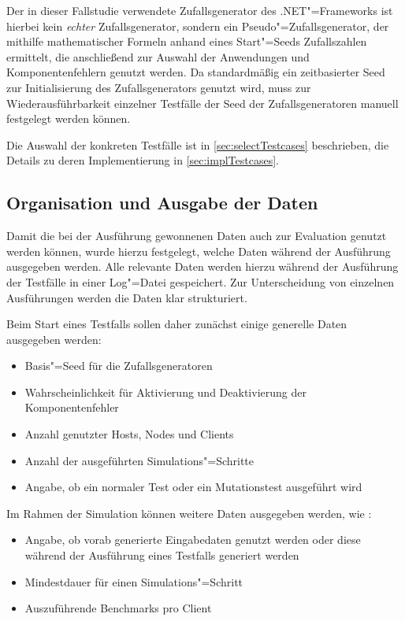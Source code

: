 Der in dieser Fallstudie verwendete Zufallsgenerator des .NET"=Frameworks ist hierbei kein \emph{echter} Zufallsgenerator, sondern ein Pseudo"=Zufallsgenerator, der mithilfe mathematischer Formeln anhand eines Start"=Seeds Zufallszahlen ermittelt, die anschließend zur Auswahl der Anwendungen und Komponentenfehlern genutzt werden.
Da standardmäßig ein zeitbasierter Seed zur Initialisierung des Zufallsgenerators genutzt wird, muss zur Wiederausführbarkeit einzelner Testfälle der Seed der Zufallsgeneratoren manuell festgelegt werden können.

Die Auswahl der konkreten Testfälle ist in \autoref{sec:selectTestcases} beschrieben, die Details zu deren Implementierung in \autoref{sec:implTestcases}.

\subsection{Organisation und Ausgabe der Daten}
\label{sec:dataOrganisation}

Damit die bei der Ausführung gewonnenen Daten auch zur Evaluation genutzt werden können, wurde hierzu festgelegt, welche Daten während der Ausführung ausgegeben werden.
Alle relevante Daten werden hierzu während der Ausführung der Testfälle in einer Log"=Datei gespeichert.
Zur Unterscheidung von einzelnen Ausführungen werden die Daten klar strukturiert.

Beim Start eines Testfalls sollen daher zunächst einige generelle Daten ausgegeben werden:

\begin{itemize}
    \item Basis"=Seed für die Zufallsgeneratoren
    \item Wahrscheinlichkeit für Aktivierung und Deaktivierung der Komponentenfehler
    \item Anzahl genutzter Hosts, Nodes und Clients
    \item Anzahl der ausgeführten Simulations"=Schritte
    \item Angabe, ob ein normaler Test oder ein Mutationstest ausgeführt wird
\end{itemize}

Im Rahmen der Simulation können weitere Daten ausgegeben werden, wie \zB:

\begin{itemize}
    \item Angabe, ob vorab generierte Eingabedaten genutzt werden oder diese während der Ausführung eines Testfalls generiert werden
    \item Mindestdauer für einen Simulations"=Schritt
    \item Auszuführende Benchmarks pro Client
\end{itemize}


